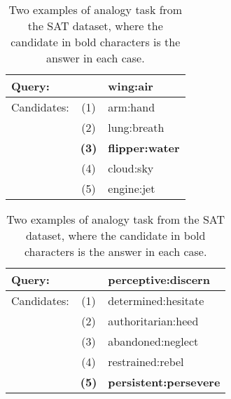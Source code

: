 \documentclass[3p]{elsarticle}
\begin{document}
{\begin{table}[t]
\centering
\begin{tabular}[t]{lcl}
\toprule
Query:       && wing:air \\
\midrule
Candidates: & (1) & arm:hand \\
 & (2) & lung:breath \\
 & \textbf{(3)} & \textbf{flipper:water} \\
 & (4) & cloud:sky \\
 & (5) & engine:jet\\
\bottomrule
\end{tabular}
\hspace{1em}
\begin{tabular}[t]{lcl}
\toprule
Query:       && perceptive:discern \\
\midrule
Candidates: & (1) & determined:hesitate \\
 & (2) & authoritarian:heed \\
 & (3) & abandoned:neglect \\
 & (4) & restrained:rebel \\
 & \textbf{(5)} & \textbf{persistent:persevere} \\
\bottomrule
\end{tabular}
\caption{Two examples of analogy task from the SAT dataset, where the candidate in bold characters is the answer in each case.}
\label{tab:relbert:sat-sample}
\end{table}


}
\end{document}
